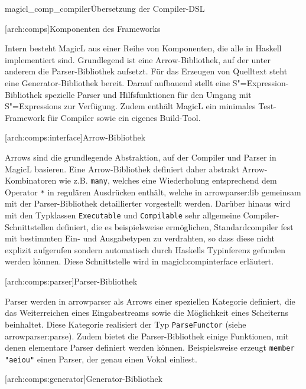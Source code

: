 \documentclass[12pt, a4paper, bibgerm]{scrbook}
\newcommand\icode[1]{\lstinline?#1?}
\newcommand\lsection{}
\newcommand\lsubsection{}
\newcommand\cref{}
\newcommand\sref{}
\newcommand\fig{}
\newcommand{\sees}[1]{(siehe \sref{#1})}
\newcommand{\sexp}{S"=Expression}
\newcommand{\sexps}{S"=Expressions}
\begin{document}
\fig{magicl_comp_compiler}{Übersetzung der Compiler-DSL}

\lsection[arch:comps]{Komponenten des Frameworks}

Intern besteht MagicL aus einer Reihe von Komponenten, die alle in
Haskell implementiert sind. Grundlegend ist eine Arrow-Bibliothek, auf
der unter anderem die Parser-Bibliothek aufsetzt. Für das Erzeugen von
Quelltext steht eine Generator-Bibliothek bereit. Darauf aufbauend
stellt eine \sexp{}-Bibliothek spezielle Parser und Hilfsfunktionen für
den Umgang mit \sexps{} zur Verfügung. Zudem enthält MagicL ein
minimales Test-Framework für Compiler sowie ein eigenes Build-Tool.

\lsubsection[arch:comps:interface]{Arrow-Bibliothek}

Arrows sind die grundlegende Abstraktion, auf der Compiler und Parser in
MagicL basieren. Eine Arrow-Bibliothek definiert daher abstrakt
Arrow-Kombinatoren wie z.B. \icode{many}, welches eine Wiederholung
entsprechend dem Operator \icode{*} in regulären Ausdrücken enthält,
welche in \sref{arrowparser:lib} gemeinsam mit der Parser-Bibliothek
detaillierter vorgestellt werden.  Darüber hinaus wird mit den Typklassen
\icode{Executable} und \icode{Compilable} sehr allgemeine
Compiler-Schnittstellen definiert, die es beispielsweise ermöglichen,
Standardcompiler fest mit bestimmten Ein- und Ausgabetypen zu
verdrahten, so dass diese nicht explizit aufgerufen sondern automatisch
durch Haskells Typinferenz gefunden werden können. Diese Schnittstelle
wird in \sref{magicl:compinterface} erläutert.

\lsubsection[arch:comps:parser]{Parser-Bibliothek}

Parser werden in \cref{arrowparser} als Arrows einer speziellen
Kategorie definiert, die das Weiterreichen eines Eingabestreams sowie
die Möglichkeit eines Scheiterns beinhaltet. Diese Kategorie realisiert
der Typ \icode{ParseFunctor} \sees{arrowparser:parse}. Zudem bietet die
Parser-Bibliothek einige Funktionen, mit denen elementare Parser
definiert werden können. Beispielsweise erzeugt \icode{member "aeiou"}
einen Parser, der genau einen Vokal einliest.

\lsubsection[arch:comps:generator]{Generator-Bibliothek}
\end{document}

